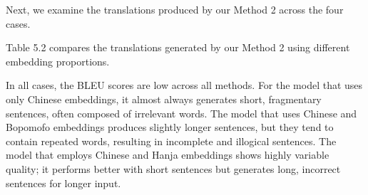 \documentclass[PhD]{PHlab-thesis}
\begin{document}

Next, we examine the translations produced by our Method 2 across the four cases. 

Table 5.2 compares the translations generated by our Method 2 using different embedding proportions.

In all cases, the BLEU scores are low across all methods. For the model that uses only Chinese embeddings, it almost always generates short, fragmentary sentences, often composed of irrelevant words. The model that uses Chinese and Bopomofo embeddings produces slightly longer sentences, but they tend to contain repeated words, resulting in incomplete and illogical sentences. The model that employs Chinese and Hanja embeddings shows highly variable quality; it performs better with short sentences but generates long, incorrect sentences for longer input.
\end{document}
